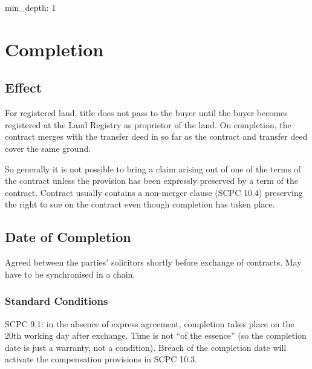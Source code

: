 \documentclass[
]{article}
\author{}
\date{}
\newenvironment{Shaded}{}{}
\newcommand{\NormalTok}[1]{#1}
\begin{document}
{
\setcounter{tocdepth}{3}
\tableofcontents
}
\begin{Shaded}
\begin{Highlighting}[]
\NormalTok{min\_depth: 1}
\end{Highlighting}
\end{Shaded}

\hypertarget{completion}{%
\section{Completion}\label{completion}}

\hypertarget{effect}{%
\subsection{Effect}\label{effect}}

For registered land, title does not pass to the buyer until the buyer
becomes registered at the Land Registry as proprietor of the land. On
completion, the contract merges with the transfer deed in so far as the
contract and transfer deed cover the same ground.

So generally it is not possible to bring a claim arising out of one of
the terms of the contract unless the provision has been expressly
preserved by a term of the contract. Contract usually contains a
non-merger clause (SCPC 10.4) preserving the right to sue on the
contract even though completion has taken place.

\hypertarget{date-of-completion}{%
\subsection{Date of Completion}\label{date-of-completion}}

Agreed between the parties' solicitors shortly before exchange of
contracts. May have to be synchronised in a chain.

\hypertarget{standard-conditions}{%
\subsubsection{Standard Conditions}\label{standard-conditions}}

SCPC 9.1: in the absence of express agreement, completion takes place on
the 20th working day after exchange. Time is not ``of the essence'' (so
the completion date is just a warranty, not a condition). Breach of the
completion date will activate the compensation provisions in SCPC 10.3.
\end{document}
